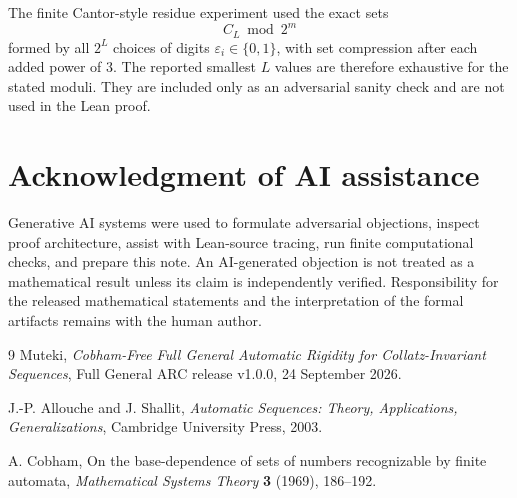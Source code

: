 \documentclass[11pt]{article}
\begin{document}
The finite Cantor-style residue experiment used the exact sets
\[
C_L\bmod 2^m
\]
formed by all $2^L$ choices of digits $\varepsilon_i\in\{0,1\}$, with set
compression after each added power of $3$.  The reported smallest $L$ values
are therefore exhaustive for the stated moduli.  They are included only as an
adversarial sanity check and are not used in the Lean proof.

\section*{Acknowledgment of AI assistance}

Generative AI systems were used to formulate adversarial objections, inspect
proof architecture, assist with Lean-source tracing, run finite computational
checks, and prepare this note.  An AI-generated objection is not treated as a
mathematical result unless its claim is independently verified.  Responsibility
for the released mathematical statements and the interpretation of the formal
artifacts remains with the human author.

\begin{thebibliography}{9}
Muteki,
\emph{Cobham-Free Full General Automatic Rigidity for Collatz-Invariant Sequences},
Full General ARC release v1.0.0, 24 September 2026.

J.-P. Allouche and J. Shallit,
\emph{Automatic Sequences: Theory, Applications, Generalizations},
Cambridge University Press, 2003.

A. Cobham,
On the base-dependence of sets of numbers recognizable by finite automata,
\emph{Mathematical Systems Theory} \textbf{3} (1969), 186--192.
\end{thebibliography}
\end{document}
